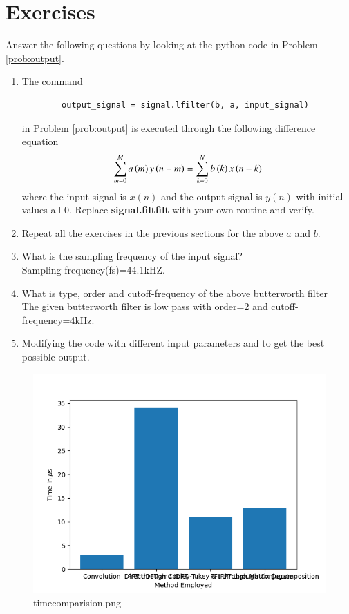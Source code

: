 \documentclass[journal,12pt,twocolumn]{IEEEtran}
\renewcommand\thesection{\arabic{section}}
\begin{document}
\section{Exercises}
Answer the following questions by looking at the python code in Problem \ref{prob:output}.
\begin{enumerate}[label=\thesection.\arabic*]
	\item
	The command
	\begin{lstlisting}
		output_signal = signal.lfilter(b, a, input_signal)
	\end{lstlisting}
	in Problem \ref{prob:output} is executed through the following difference equation
	\begin{equation}
		\label{eq:iir_filter_gen}
		\sum _{m=0}^{M}a\left(m\right)y\left(n-m\right)=\sum _{k=0}^{N}b\left(k\right)x\left(n-k\right)
	\end{equation}
	where the input signal is $x(n)$ and the output signal is $y(n)$ with initial values all 0. Replace
	\textbf{signal.filtfilt} with your own routine and verify.
	\item Repeat all the exercises in the previous sections for the above $a$ and $b$.
	\item What is the sampling frequency of the input signal?
	\\
	\solution
	Sampling frequency(fs)=44.1kHZ.
	\item
	What is type, order and  cutoff-frequency of the above butterworth filter
	\\
	\solution
	The given butterworth filter is low pass with order=2 and cutoff-frequency=4kHz.
	\item
	Modifying the code with different input parameters and to get the best possible output.
\end{enumerate}
\begin{figure}[!ht]
	\centering
	\includegraphics[width=\columnwidth]{./figs/timecomparision.png}
	\caption{timecomparision.png}
	\label{fig-7.13}	
\end{figure}
\end{document}
